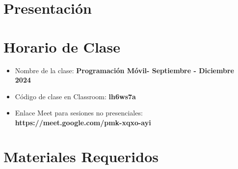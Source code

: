 \documentclass[aspectratio=169]{beamer}
\title[\abreviaturaNombreMateria]{\nombreMateria} %
\author{Dr. Marco Aurelio Nuño Maganda} %
\institute[UPV] %
{
Universidad Politecnica de Victoria \\ %
Ingenieria en Tecnologias de la Informacion \\ %
Cuatrimestre \cuatrimestre  \\ %
\medskip
\textit{mnunom@upv.edu.mx} %
}
\date{\today} %
\newcommand{\nombreMateria}{Programación Móvil}
\newcommand{\cuatrimestre}{Septiembre - Diciembre 2024}
\newcommand{\claveClassroom}{lh6ws7a}
\newcommand{\claveMeet}{https://meet.google.com/pmk-xqxo-ayi}
\begin{document}
\begin{frame}
\titlepage %
\end{frame}




\section{Presentación} 



\section{Horario de Clase}

%





\begin{frame}
\begin{itemize}
\frametitle{Plataforma Virtual para el Curso}
\item Nombre de la clase: \textbf{\nombreMateria - \cuatrimestre}
\item Código de clase en Classroom: \textbf{\claveClassroom}
\item Enlace Meet para sesiones no presenciales: \textbf{\claveMeet}
\end{itemize}

\end{frame}












%




\section{Materiales Requeridos}
%

\end{document}
